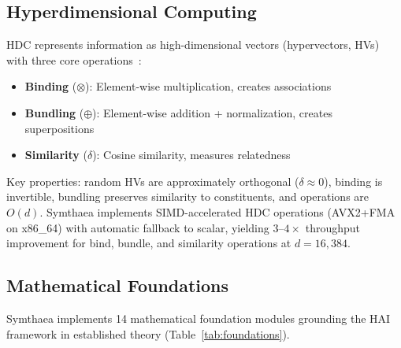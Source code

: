 \documentclass[10pt,letterpaper]{article}
\begin{document}
\subsection{Hyperdimensional Computing}

HDC represents information as high-dimensional vectors (hypervectors, HVs) with three core operations~\cite{kanerva2009hyperdimensional}:
\begin{itemize}[nosep]
  \item \textbf{Binding} ($\otimes$): Element-wise multiplication, creates associations
  \item \textbf{Bundling} ($\oplus$): Element-wise addition + normalization, creates superpositions
  \item \textbf{Similarity} ($\delta$): Cosine similarity, measures relatedness
\end{itemize}

Key properties: random HVs are approximately orthogonal ($\delta \approx 0$), binding is invertible, bundling preserves similarity to constituents, and operations are $O(d)$. Symthaea implements SIMD-accelerated HDC operations (AVX2+FMA on x86\_64) with automatic fallback to scalar, yielding $3$--$4\times$ throughput improvement for bind, bundle, and similarity operations at $d = 16{,}384$.

\subsection{Mathematical Foundations}

Symthaea implements 14 mathematical foundation modules grounding the HAI framework in established theory (Table~\ref{tab:foundations}).
\end{document}
